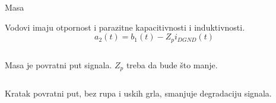\begin{frame}[label=08-s006]{Masa}
\setlength{\parskip}{2pt}\setlength{\abovedisplayskip}{4pt}\setlength{\belowdisplayskip}{4pt}
\centering\par\medskip\raggedright
Vodovi imaju otpornost i parazitne kapacitivnosti i induktivnosti.
\[a_2(t)=b_1(t)-Z_p i_{DGND}(t)\]
\begin{columns}[c,onlytextwidth]
\alert{Masa je povratni put signala.}
$Z_p$ treba da bude što manje.
\end{columns}\medskip
Kratak povratni put, bez rupa i uskih grla, smanjuje degradaciju signala.
\end{frame}
